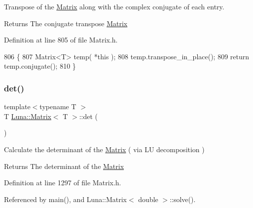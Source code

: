 Transpose of the \hyperlink{classLuna_1_1Matrix}{Matrix} along with the complex conjugate of each entry. 

\begin{DoxyReturn}{Returns}
The conjugate transpose \hyperlink{classLuna_1_1Matrix}{Matrix} 
\end{DoxyReturn}


Definition at line 805 of file Matrix.\+h.


\begin{DoxyCode}
806   \{
807     Matrix<T> temp( *\textcolor{keyword}{this} );
808     temp.transpose\_in\_place();
809     \textcolor{keywordflow}{return} temp.conjugate();
810   \}
\end{DoxyCode}
\mbox{\label{classLuna_1_1Matrix_ab1325b95f71885bfaabeeeb875bef542}} 
\subsubsection{\texorpdfstring{det()}{det()}}
{\footnotesize\ttfamily template$<$typename T $>$ \\
T \hyperlink{classLuna_1_1Matrix}{Luna\+::\+Matrix}$<$ T $>$\+::det (\begin{DoxyParamCaption}{ }\end{DoxyParamCaption})\hspace{0.3cm}{\ttfamily [inline]}}



Calculate the determinant of the \hyperlink{classLuna_1_1Matrix}{Matrix} ( via LU decomposition ) 

\begin{DoxyReturn}{Returns}
The determinant of the \hyperlink{classLuna_1_1Matrix}{Matrix} 
\end{DoxyReturn}


Definition at line 1297 of file Matrix.\+h.



Referenced by main(), and Luna\+::\+Matrix$<$ double $>$\+::solve().


